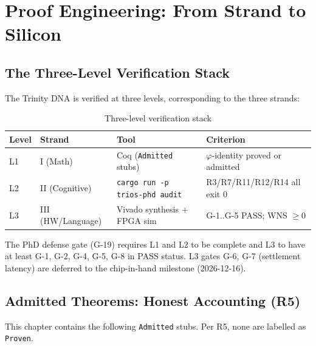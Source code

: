 
\section{Proof Engineering: From Strand to Silicon}
\label{sec74:proof-engineering}

\subsection{The Three-Level Verification Stack}
\label{sec74:verification-stack}

The Trinity DNA is verified at three levels, corresponding to the three strands:

\begin{table}[H]
\centering
\caption{Three-level verification stack}
\label{tab74:verif-stack}
\small
\begin{tabular}{llp{5cm}p{4cm}}
\toprule
Level & Strand & Tool & Criterion \\
\midrule
L1 & I (Math)    & Coq (\texttt{Admitted} stubs)        & $\varphi$-identity proved or admitted \\
L2 & II (Cognitive) & \texttt{cargo run -p trios-phd audit} & R3/R7/R11/R12/R14 all exit 0 \\
L3 & III (HW/Language) & Vivado synthesis + FPGA sim      & G-1..G-5 PASS; WNS $\geq 0$ \\
\bottomrule
\end{tabular}
\end{table}

The PhD defense gate (G-19) requires L1 and L2 to be complete and L3 to
have at least G-1, G-2, G-4, G-5, G-8 in PASS status.  L3 gates G-6, G-7
(settlement latency) are deferred to the chip-in-hand milestone
(2026-12-16).

\subsection{Admitted Theorems: Honest Accounting (R5)}
\label{sec74:admitted-accounting}

This chapter contains the following \texttt{Admitted} stubs.  Per R5,
none are labelled as \texttt{Proven}.

